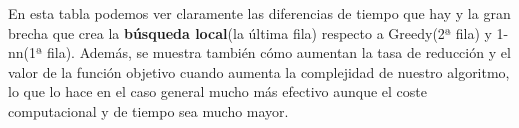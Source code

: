 \documentclass[11pt]{article}
\begin{document}
En esta tabla podemos ver claramente las diferencias de tiempo que hay y la gran brecha que crea la \textbf{búsqueda local}(la última fila) respecto a Greedy(2ª fila) y 1-nn(1ª fila). Además, se muestra también cómo aumentan la tasa de reducción y el valor de la función objetivo cuando aumenta la complejidad de nuestro algoritmo, lo que lo hace en el caso general mucho más efectivo aunque el coste computacional y de tiempo sea mucho mayor.
\end{document}
